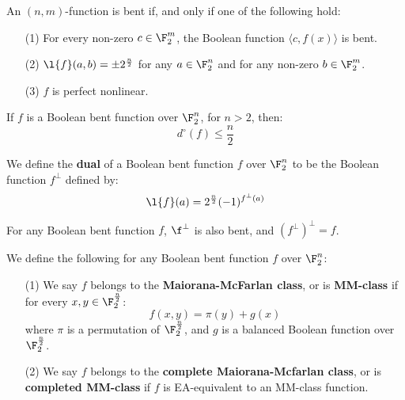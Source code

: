 \begin{thoerem}\label{theorem_1.2.7}
  An $(n,m)$-function is bent if, and only if one of the following hold:
  \begin{enumerate}
    \item[(1)] For every non-zero $c \in \F_2^m$, the Boolean function $\langle
      c,f(x) \rangle$ is bent.

    \item[(2)] $\l{f}(a,b)=\pm{2^{\frac{n}{2}}}$ for any $a \in \F_2^n$ and for
      any non-zero $b \in \F_2^m$.

    \item[(3)] $f$ is perfect nonlinear.
  \end{enumerate}
\end{thoerem}

\begin{lemma}\label{lemma_1.2.8}
  If $f$ is a Boolean bent function over $\F_2^n$, for $n>2$, then:
  \begin{equation*}
    d^\circ(f) \leq \frac{n}{2}
  \end{equation*}
\end{lemma}

\begin{definition}
  We define the \textbf{dual} of a Boolean bent function $f$ over  $\F_2^n$ to
  be the Boolean function $f^\perp$ defined by:
  \begin{equation}\label{equation_1.20}
    \l{f}(a)=2^{\frac{n}{2}}(-1)^{f^\perp(a)}
  \end{equation}
\end{definition}

\begin{lemma}\label{lemma_1.2.8}
  For any Boolean bent function $f$,  $\f^\perp$ is also bent, and
  $(f^\perp)^\perp=f$.
\end{lemma}

\begin{definition}
  We define the following for any Boolean bent function $f$ over $\F_2^n$:
  \begin{enumerate}
    \item[(1)] We say $f$ belongs to the  \textbf{Maiorana-McFarlan class}, or
      is \textbf{MM-class} if for every $x,y \in \F_2^{\frac{n}{2}}$:
      \begin{equation}\label{equation_1.21}
        f(x,y)=\pi(y)+g(x)
      \end{equation}
      where $\pi$ is a permutation of $\F_2^{\frac{n}{2}}$, and $g$ is a
      balanced Boolean function over $\F_2^{\frac{n}{2}}$.

    \item[(2)] We say $f$ belongs to the \textbf{complete Maiorana-Mcfarlan
      class}, or is \textbf{completed MM-class} if $f$ is  EA-equivalent to an
      MM-class function.
  \end{enumerate}
\end{definition}

